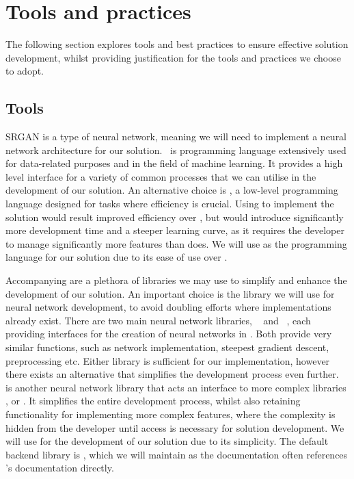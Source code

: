 \section{Tools and practices}
The following section explores tools and best practices to ensure effective solution development, whilst providing justification for the tools and practices we choose to adopt.

\subsection{Tools}
SRGAN is a type of neural network, meaning we will need to implement a neural network architecture for our solution.\  is programming language extensively used for data-related purposes and in the field of machine learning. It provides a high level interface for a variety of common processes that we can utilise in the development of our solution. An alternative choice is , a low-level programming language designed for tasks where efficiency is crucial. Using  to implement the solution would result improved efficiency over , but would introduce significantly more development time and a steeper learning curve, as it requires the developer to manage significantly more features than  does. We will use  as the programming language for our solution due to its ease of use over .

Accompanying  are a plethora of libraries we may use to simplify and enhance the development of our solution. An important choice is the library we will use for neural network development, to avoid doubling efforts where implementations already exist. There are two main neural network libraries, ~\cite{tensorflow} and ~\cite{pytorch}, each providing interfaces for the creation of neural networks in . Both provide very similar functions, such as network implementation, steepest gradient descent, preprocessing etc. Either library is sufficient for our implementation, however there exists an alternative that simplifies the development process even further.\ ~\cite{keras} is another neural network library that acts an interface to more complex libraries ,  or . It simplifies the entire development process, whilst also retaining functionality for implementing more complex features, where the complexity is hidden from the developer until access is necessary for solution development. We will use  for the development of our solution due to its simplicity. The default backend library is , which we will maintain as the  documentation often references 's documentation directly.

